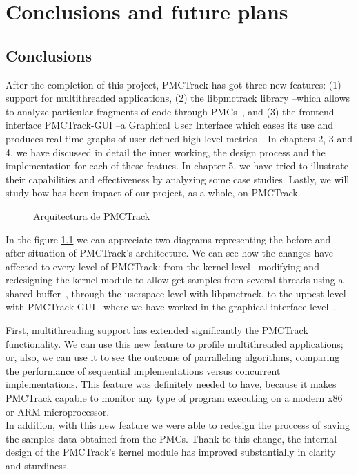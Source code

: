 \chapter{Conclusions and future plans}


\section{Conclusions}

After the completion of this project, PMCTrack has got three new features: (1) support for multithreaded applications, (2) the libpmctrack library --which allows to analyze particular fragments of code through PMCs--, and (3) the frontend interface PMCTrack-GUI --a Graphical User Interface which eases its use and produces real-time graphs of user-defined high level metrics--. In chapters 2, 3 and 4, we have discussed in detail the inner working, the design process and the implementation for each of these featues. In chapter 5, we have tried to illustrate their capabilities and effectiveness by analyzing some case studies. Lastly, we will study how has been impact of our project, as a whole, on PMCTrack.

\begin{figure}%
    \centering
    \qquad
\caption{Arquitectura de PMCTrack}%
\label{fig:beforeandafter}%
\end{figure}

In the figure \ref{fig:beforeandafter} we can appreciate two diagrams representing the before and after situation of PMCTrack's architecture. We can see how the changes have affected to every level of PMCTrack: from the kernel level --modifying and redesigning the kernel module to allow get samples from several threads using a shared buffer--, through the userspace level with libpmctrack, to the uppest level with PMCTrack-GUI --where we have worked in the graphical interface level--.

First, multithreading support has extended significantly the PMCTrack functionality. We can use this new feature to profile multithreaded applications; or, also, we can use it to see the outcome of parralleling algorithms, comparing the performance of sequential implementations versus concurrent implementations. This feature was definitely needed to have, because it makes PMCTrack capable to monitor any type of program executing on a modern x86 or ARM microprocessor.\\%
In addition, with this new feature we were able to redesign the proccess of saving the samples data obtained from the PMCs. Thank to this change, the internal design of the PMCTrack's kernel module has improved substantially in clarity and sturdiness.

